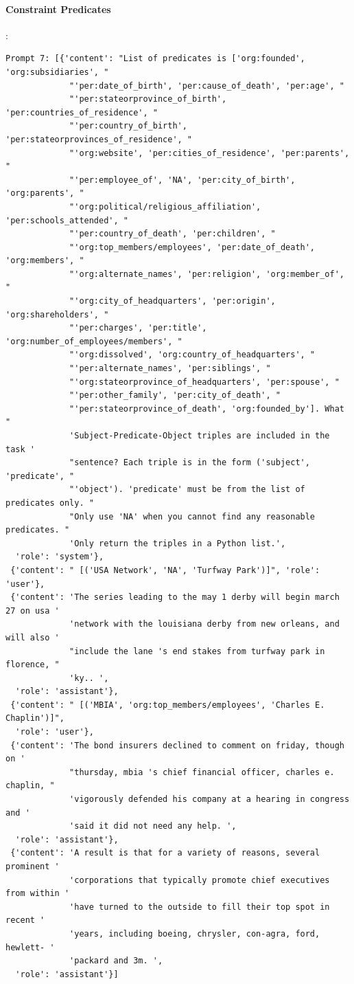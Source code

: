 \documentclass{article}
\begin{document}
\paragraph{Constraint Predicates}:
\begin{lstlisting}
Prompt 7: [{'content': "List of predicates is ['org:founded', 'org:subsidiaries', "
             "'per:date_of_birth', 'per:cause_of_death', 'per:age', "
             "'per:stateorprovince_of_birth', 'per:countries_of_residence', "
             "'per:country_of_birth', 'per:stateorprovinces_of_residence', "
             "'org:website', 'per:cities_of_residence', 'per:parents', "
             "'per:employee_of', 'NA', 'per:city_of_birth', 'org:parents', "
             "'org:political/religious_affiliation', 'per:schools_attended', "
             "'per:country_of_death', 'per:children', "
             "'org:top_members/employees', 'per:date_of_death', 'org:members', "
             "'org:alternate_names', 'per:religion', 'org:member_of', "
             "'org:city_of_headquarters', 'per:origin', 'org:shareholders', "
             "'per:charges', 'per:title', 'org:number_of_employees/members', "
             "'org:dissolved', 'org:country_of_headquarters', "
             "'per:alternate_names', 'per:siblings', "
             "'org:stateorprovince_of_headquarters', 'per:spouse', "
             "'per:other_family', 'per:city_of_death', "
             "'per:stateorprovince_of_death', 'org:founded_by']. What "
             'Subject-Predicate-Object triples are included in the task '
             "sentence? Each triple is in the form ('subject', 'predicate', "
             "'object'). 'predicate' must be from the list of predicates only. "
             "Only use 'NA' when you cannot find any reasonable predicates. "
             'Only return the triples in a Python list.',
  'role': 'system'},
 {'content': " [('USA Network', 'NA', 'Turfway Park')]", 'role': 'user'},
 {'content': 'The series leading to the may 1 derby will begin march 27 on usa '
             'network with the louisiana derby from new orleans, and will also '
             "include the lane 's end stakes from turfway park in florence, "
             'ky.. ',
  'role': 'assistant'},
 {'content': " [('MBIA', 'org:top_members/employees', 'Charles E. Chaplin')]",
  'role': 'user'},
 {'content': 'The bond insurers declined to comment on friday, though on '
             "thursday, mbia 's chief financial officer, charles e. chaplin, "
             'vigorously defended his company at a hearing in congress and '
             'said it did not need any help. ',
  'role': 'assistant'},
 {'content': 'A result is that for a variety of reasons, several prominent '
             'corporations that typically promote chief executives from within '
             'have turned to the outside to fill their top spot in recent '
             'years, including boeing, chrysler, con-agra, ford, hewlett- '
             'packard and 3m. ',
  'role': 'assistant'}]



\end{lstlisting}
\end{document}
